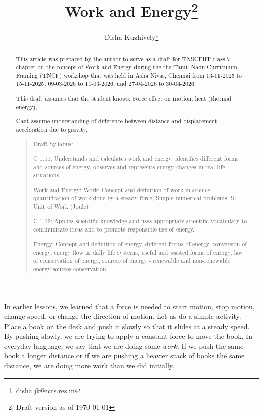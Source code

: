 \documentclass{xtufte-handout}
\title{Work and Energy\thanks{Draft version as of \today}}
\author{Disha Kuzhively\thanks{disha.jk@icts.res.in}}
\begin{document}
\maketitle
\begin{abstract}
This article was prepared by the author to serve as a draft for TNSCERT class 7 chapter on the concept of Work and Energy during the the Tamil Nadu Curriculum Framing (TNCF) workshop that was held in Asha Nivas, Chennai  from 13-11-2025 to 15-11-2025, 09-03-2026 to 10-03-2026, and 27-04-2026 to 30-04-2026.

This draft assumes that the student knows: Force effect on motion, heat (thermal energy), 

Cant assume understanding of difference between distance and displacement, acceleration due to gravity, 

\begin{quotation}
Draft Syllabus:

C 1.11: Understands and calculates work and energy, identifies different forms and sources of energy, observes and represents energy changes in real-life situations.

Work and Energy:
Work: Concept and definition of work in science - quantification of work done by a steady force, Simple numerical problems, SI Unit of Work (Joule)

C 1.12: Applies scientific knowledge and uses appropriate scientific vocabulary to communicate ideas and to promote responsible use of energy.

Energy: Concept and definition of energy, different forms of energy, conversion of energy, energy flow in daily life systems, useful and wasted forms of energy, law of conservation of energy, sources of energy - renewable and non-renewable energy sources-conservation
\end{quotation}
\end{abstract}

In earlier lessons, we learned that a force is needed to start motion, stop motion, change speed, or change the direction of motion. Let us do a simple activity. Place a book on the desk and push it slowly so that it slides at a steady speed. By pushing slowly, we are trying to apply a constant force to move the book. In everyday language, we say that we are doing some \emph{work}. If we push the same book a longer distance or if we are pushing a heavier stack of books the same distance, we are doing more work than we did initially.
\end{document}
